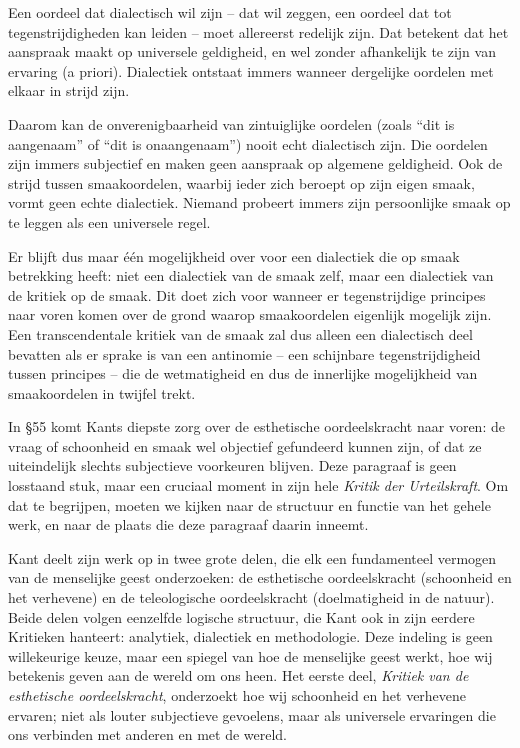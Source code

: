 \begin{mdframed}[leftmargin=0pt,rightmargin=0pt,backgroundcolor=blue!6,linecolor=white,innertopmargin=6pt,innerbottommargin=6pt]

Een oordeel dat dialectisch wil zijn – dat wil zeggen, een oordeel dat tot tegenstrijdigheden kan leiden – moet allereerst redelijk zijn. Dat betekent dat het aanspraak maakt op universele geldigheid, en wel zonder afhankelijk te zijn van ervaring (a priori). Dialectiek ontstaat immers wanneer dergelijke oordelen met elkaar in strijd zijn.

Daarom kan de onverenigbaarheid van zintuiglijke oordelen (zoals ``dit is aangenaam'' of ``dit is onaangenaam'') nooit echt dialectisch zijn. Die oordelen zijn immers subjectief en maken geen aanspraak op algemene geldigheid. Ook de strijd tussen smaakoordelen, waarbij ieder zich beroept op zijn eigen smaak, vormt geen echte dialectiek. Niemand probeert immers zijn persoonlijke smaak op te leggen als een universele regel.

Er blijft dus maar één mogelijkheid over voor een dialectiek die op smaak betrekking heeft: niet een dialectiek van de smaak zelf, maar een dialectiek van de kritiek op de smaak. Dit doet zich voor wanneer er tegenstrijdige principes naar voren komen over de grond waarop smaakoordelen eigenlijk mogelijk zijn. Een transcendentale kritiek van de smaak zal dus alleen een dialectisch deel bevatten als er sprake is van een antinomie – een schijnbare tegenstrijdigheid tussen principes – die de wetmatigheid en dus de innerlijke mogelijkheid van smaakoordelen in twijfel trekt.

\bigskip
In §55 komt Kants diepste zorg over de esthetische oordeelskracht naar voren: de vraag of schoonheid en smaak wel objectief gefundeerd kunnen zijn, of dat ze uiteindelijk slechts subjectieve voorkeuren blijven. Deze paragraaf is geen losstaand stuk, maar een cruciaal moment in zijn hele \textit{Kritik der Urteilskraft}. Om dat te begrijpen, moeten we kijken naar de structuur en functie van het gehele werk, en naar de plaats die deze paragraaf daarin inneemt.

Kant deelt zijn werk op in twee grote delen, die elk een fundamenteel vermogen van de menselijke geest onderzoeken: de esthetische oordeelskracht (schoonheid en het verhevene) en de teleologische oordeelskracht (doelmatigheid in de natuur). Beide delen volgen eenzelfde logische structuur, die Kant ook in zijn eerdere Kritieken hanteert: analytiek, dialectiek en methodologie. Deze indeling is geen willekeurige keuze, maar een spiegel van hoe de menselijke geest werkt, hoe wij betekenis geven aan de wereld om ons heen.
Het eerste deel, \textit{Kritiek van de esthetische oordeelskracht}, onderzoekt hoe wij schoonheid en het verhevene ervaren; niet als louter subjectieve gevoelens, maar als universele ervaringen die ons verbinden met anderen en met de wereld.


\end{mdframed}
